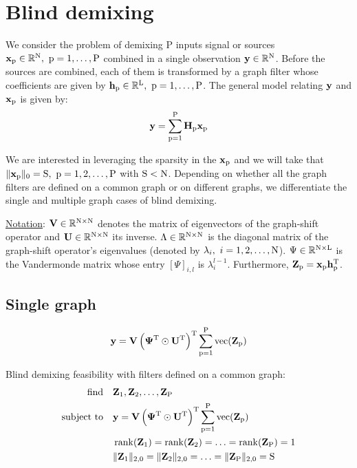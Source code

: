 \documentclass{article}
\newcommand{\numSources}{\text{P}}
\newcommand{\sourceIndex}{\text{p}}
\DeclareMathOperator{\vect}{vec}
\DeclareMathOperator{\rank}{rank}
\begin{document}
\section*{Blind demixing}

We consider the problem of demixing $\numSources$ inputs signal or sources $\bbx_{\sourceIndex} \in \mathbb{R}^{\rmN}, \ \sourceIndex=1,\ldots,\numSources$ combined in a single observation ${\mathbf y} \in \mathbb{R}^{{\text{N}}}$. Before the sources are combined, each of them is transformed by a graph filter whose coefficients are given by $\bbh_{\sourceIndex} \in \mathbb{R}^{\rmL}, \ \sourceIndex=1,\ldots,\numSources$. The general model relating ${\mathbf y}$ and $\bbx_{\sourceIndex}$ is given by:
\begin{equation}
  \bby = \sum_{\sourceIndex=1}^{\numSources} \bbH_{\sourceIndex} \bbx_{\sourceIndex}
\end{equation}

We are interested in leveraging the sparsity in the $\bbx_{\sourceIndex}$ and we will take that $\|\bbx_{\sourceIndex}\|_{0}=\rmS, \ \sourceIndex=1,2,\ldots,\numSources$ with ${\text{S}} < {\text{N}}$. Depending on whether all the graph filters are defined on a common graph or on different graphs, we differentiate the single and multiple graph cases of blind demixing.

\vspace{5mm}
\noindent
\underline{Notation}: ${\mathbf V} \in \mathbb{R}^{{\text{N}} \times {\ensuremath\text{N}}}$ denotes the matrix of eigenvectors of the graph-shift operator and ${\mathbf U} \in \mathbb{R}^{{\text{N}} \times {\ensuremath\text{N}}}$ its inverse. $\Lambda \in \mathbb{R}^{{\text{N}} \times {\ensuremath\text{N}}}$ is the diagonal matrix of the graph-shift operator's eigenvalues (denoted by $\lambda_{i}, \ i=1,2,\ldots,\rmN$). $\Psi \in \mathbb{R}^{{\text{N}} \times {\ensuremath\text{L}}}$ is the Vandermonde matrix whose entry $[\Psi]_{i,l}$ is $\lambda_{i}^{l-1}$. Furthermore, $\bbZ_{\sourceIndex}=\bbx_{\sourceIndex} \bbh_{\sourceIndex}^{\rmT}$.

\subsection*{Single graph}

\begin{equation}
  \bby = \bbV \left(\bbPsi^{\rmT} \odot \bbU^{\rmT} \right)^{\rmT}\sum_{\sourceIndex=1}^{\numSources} \vect(\bbZ_{\sourceIndex})
\end{equation}

Blind demixing feasibility with filters defined on a common graph:
\begin{align}
  \mathop{\text{find}} \quad & \bbZ_{1}, \bbZ_{2}, \ldots, \bbZ_{\numSources} \\
  \text{subject to} \quad & \bby = \bbV \left(\bbPsi^{\rmT} \odot \bbU^{\rmT} \right)^{\rmT}\sum_{\sourceIndex=1}^{\numSources} \vect(\bbZ_{\sourceIndex}) \nonumber \\
  & \rank(\bbZ_{1}) = \rank(\bbZ_{2}) = \ldots = \rank(\bbZ_{\numSources}) = 1 \nonumber \\
  & \|\bbZ_{1}\|_{2,0} = \|\bbZ_{2}\|_{2,0} = \ldots = \|\bbZ_{\numSources}\|_{2,0} = \rmS \nonumber
\end{align}
\end{document}
